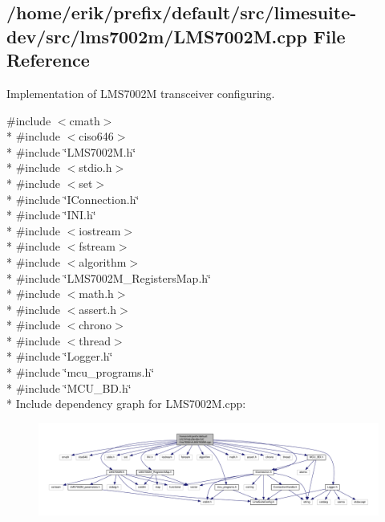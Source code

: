 \subsection{/home/erik/prefix/default/src/limesuite-\/dev/src/lms7002m/\+L\+M\+S7002M.cpp File Reference}
\label{LMS7002M_8cpp}


Implementation of L\+M\+S7002M transceiver configuring.  


{\ttfamily \#include $<$cmath$>$}\\*
{\ttfamily \#include $<$ciso646$>$}\\*
{\ttfamily \#include \char`\"{}L\+M\+S7002\+M.\+h\char`\"{}}\\*
{\ttfamily \#include $<$stdio.\+h$>$}\\*
{\ttfamily \#include $<$set$>$}\\*
{\ttfamily \#include \char`\"{}I\+Connection.\+h\char`\"{}}\\*
{\ttfamily \#include \char`\"{}I\+N\+I.\+h\char`\"{}}\\*
{\ttfamily \#include $<$iostream$>$}\\*
{\ttfamily \#include $<$fstream$>$}\\*
{\ttfamily \#include $<$algorithm$>$}\\*
{\ttfamily \#include \char`\"{}L\+M\+S7002\+M\+\_\+\+Registers\+Map.\+h\char`\"{}}\\*
{\ttfamily \#include $<$math.\+h$>$}\\*
{\ttfamily \#include $<$assert.\+h$>$}\\*
{\ttfamily \#include $<$chrono$>$}\\*
{\ttfamily \#include $<$thread$>$}\\*
{\ttfamily \#include \char`\"{}Logger.\+h\char`\"{}}\\*
{\ttfamily \#include \char`\"{}mcu\+\_\+programs.\+h\char`\"{}}\\*
{\ttfamily \#include \char`\"{}M\+C\+U\+\_\+\+B\+D.\+h\char`\"{}}\\*
Include dependency graph for L\+M\+S7002\+M.\+cpp\+:
\nopagebreak
\begin{figure}[H]
\begin{center}
\leavevmode
\includegraphics[width=350pt]{d1/d4e/LMS7002M_8cpp__incl}
\end{center}
\end{figure}
